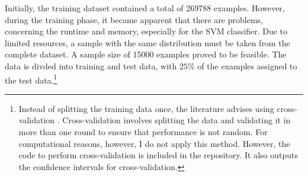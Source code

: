 \documentclass[12pt, a4paper, titlepage]{article}
\begin{document}
Initially, the training dataset contained a total of 269788 examples. However, during the training phase, it became apparent that there are problems, concerning the runtime and memory, especially for the \ac{SVM} classifier. Due to limited resources, a sample with the same distribution must be taken from the complete dataset. A sample size of 15000 examples proved to be feasible. The data is divded into training and test data, with $25\%$ of the examples assigned to the test data.\footnote{Instead of splitting the training data once, the literature advises using cross-validation \citep{refaeilzadeh2009}. Cross-validation involves splitting the data and validating it in more than one round to ensure that performance is not random. For computational reasons, however, I do not apply this method. However, the code to perform cross-validation is included in the repository. It also outputs the confidence intervals for cross-validation.} 
\end{document}
